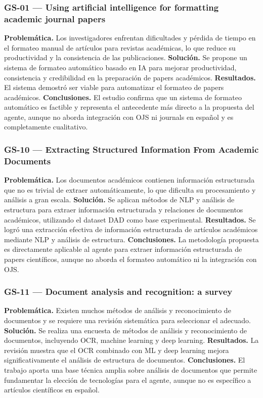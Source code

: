 \subsubsection*{GS-01 --- Using artificial intelligence for formatting academic journal papers \cite{ref5}}

\textbf{Problemática.} Los investigadores enfrentan dificultades y pérdida de tiempo en el formateo manual de artículos para revistas académicas, lo que reduce su productividad y la consistencia de las publicaciones. \textbf{Solución.} Se propone un sistema de formateo automático basado en IA para mejorar productividad, consistencia y credibilidad en la preparación de papers académicos. \textbf{Resultados.} El sistema demostró ser viable para automatizar el formateo de papers académicos. \textbf{Conclusiones.} El estudio confirma que un sistema de formateo automático es factible y representa el antecedente más directo a la propuesta del agente, aunque no aborda integración con OJS ni journals en español y es completamente cualitativo.

\subsubsection*{GS-10 --- Extracting Structured Information From Academic Documents \cite{ref6}}

\textbf{Problemática.} Los documentos académicos contienen información estructurada que no es trivial de extraer automáticamente, lo que dificulta su procesamiento y análisis a gran escala. \textbf{Solución.} Se aplican métodos de NLP y análisis de estructura para extraer información estructurada y relaciones de documentos académicos, utilizando el dataset DAD como base experimental. \textbf{Resultados.} Se logró una extracción efectiva de información estructurada de artículos académicos mediante NLP y análisis de estructura. \textbf{Conclusiones.} La metodología propuesta es directamente aplicable al agente para extraer información estructurada de papers científicos, aunque no aborda el formateo automático ni la integración con OJS.

\subsubsection*{GS-11 --- Document analysis and recognition: a survey \cite{ref7}}

\textbf{Problemática.} Existen muchos métodos de análisis y reconocimiento de documentos y se requiere una revisión sistemática para seleccionar el adecuado. \textbf{Solución.} Se realiza una encuesta de métodos de análisis y reconocimiento de documentos, incluyendo OCR, machine learning y deep learning. \textbf{Resultados.} La revisión muestra que el OCR combinado con ML y deep learning mejora significativamente el análisis de estructura de documentos. \textbf{Conclusiones.} El trabajo aporta una base técnica amplia sobre análisis de documentos que permite fundamentar la elección de tecnologías para el agente, aunque no es específico a artículos científicos en español.

